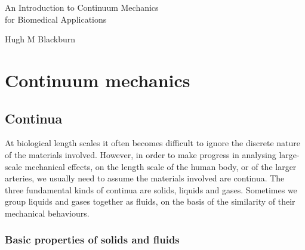 \documentclass[a4paper,11pt]		{report}
\begin{document}
\begin{titlepage}

\vspace*{15em}

\begin{center}
{\huge
An Introduction to Continuum Mechanics\\[5pt]
for Biomedical Applications
}

\vspace*{15em}

{\Large Hugh M Blackburn}

\end{center}

\end{titlepage}



\part{Continuum mechanics}





\chapter{Continua}
\label{ch.cont}

At biological length scales it often becomes difficult to ignore the
discrete nature of the materials involved. However, in order to make
progress in analysing large-scale mechanical effects, \eg on the
length scale of the human body, or of the larger arteries, we usually
need to assume the materials involved are continua. The three
fundamental kinds of continua are solids, liquids and gases. Sometimes
we group liquids and gases together as fluids, on the basis of the
similarity of their mechanical behaviours.

\section{Basic properties of solids and fluids}
\end{document}
